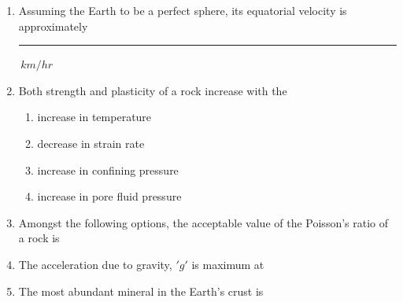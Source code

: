 \documentclass[journal,12pt,onecolumn]{IEEEtran}
\theoremstyle{remark}
\begin{document}
\begin{enumerate}
        \item Assuming the Earth to be a perfect sphere, its equatorial velocity is approximately \rule{3cm}{0.15mm}$\,km/hr$ \hfill{}

        \item Both strength and plasticity of a rock increase with the \hfill{}
            \begin{enumerate}
                \item increase in temperature
                \item decrease in strain rate
                \item increase in confining pressure
                \item increase in pore fluid pressure
            \end{enumerate}
            
        \item Amongst the following options, the acceptable value of the Poisson's ratio of a rock is \hfill{}
            \begin{enumerate}
            \end{enumerate}

        \item The acceleration due to gravity, $'g'$ is maximum at \hfill{}
            \begin{enumerate}
            \end{enumerate}

        \item The most abundant mineral in the Earth's crust is \hfill{}
            \begin{enumerate}
            \end{enumerate}


\end{enumerate}
\end{document}
